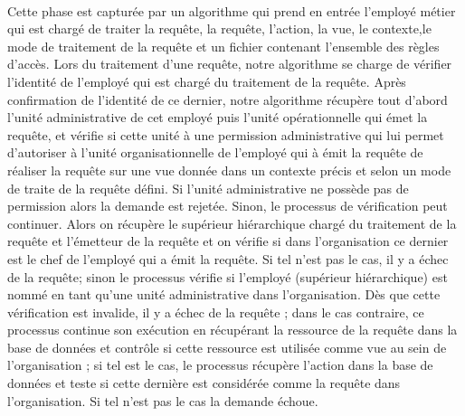 \paragraph{} Cette phase est capturée par un algorithme qui prend en entrée l'employé métier qui est chargé de traiter la requête, la requête, l'action, la vue, le contexte,le mode de traitement de la requête et un fichier contenant l'ensemble des règles d'accès. Lors du traitement d'une requête, notre algorithme se charge de vérifier l'identité de l'employé qui est chargé du traitement de la requête. Après confirmation de l'identité de ce dernier, notre algorithme récupère tout d'abord l'unité administrative de cet employé puis l'unité opérationnelle qui émet la requête, et vérifie si cette unité à une permission administrative qui lui permet d'autoriser à l'unité organisationnelle de l'employé qui à émit la requête de réaliser la requête sur une vue donnée dans un contexte précis et selon un mode de traite de la requête défini. Si l'unité administrative ne possède pas de permission alors la demande est rejetée. Sinon, le processus de vérification peut continuer. Alors on récupère le supérieur hiérarchique chargé du traitement de la requête et l'émetteur de la requête et on vérifie si dans l'organisation ce dernier est le chef de l'employé qui a émit la requête. Si tel n'est pas le cas, il y a échec de la requête; sinon le processus vérifie si l'employé (supérieur hiérarchique) est nommé en tant qu'une unité administrative dans l'organisation. Dès que cette vérification est invalide, il y a échec de la requête ; dans le cas contraire, ce processus continue son exécution en récupérant la ressource de la requête dans la base de données et contrôle si cette ressource est utilisée comme vue au sein de l'organisation ; si tel est le cas, le processus récupère l'action dans la base de données et teste si cette dernière est considérée comme la requête dans l'organisation. Si tel n'est pas le cas la demande échoue.

